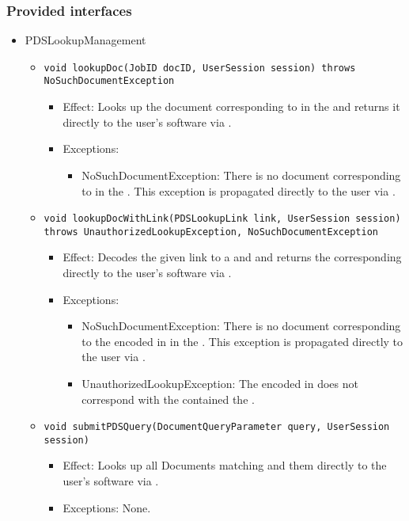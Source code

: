 \subsubsection*{Provided interfaces}
\begin{itemize}
    \item PDSLookupManagement
    \begin{itemize}
        \item \texttt{void lookupDoc(JobID docID, UserSession session) throws NoSuchDocumentException}
        \begin{itemize}
            \item Effect: Looks up the document corresponding to  in the  and returns it directly to the user's software via .
            \item Exceptions: 
			\begin{itemize}
				\item NoSuchDocumentException: There is no document corresponding to  in the . This exception is propagated directly to the user via .
			\end{itemize}
        \end{itemize}

        \item \texttt{void lookupDocWithLink(PDSLookupLink link, UserSession session) throws UnauthorizedLookupException, NoSuchDocumentException}
		    \begin{itemize}
                \item Effect: Decodes the given link to a  and  and returns the corresponding  directly to the user's software via .
                \item Exceptions: 
				\begin{itemize}
					\item NoSuchDocumentException: There is no document corresponding to the  encoded in  in the . This exception is propagated directly to the user via .
					\item UnauthorizedLookupException: The  encoded in  does not correspond with the  contained the .
				\end{itemize}
            \end{itemize}

		\item \texttt{void submitPDSQuery(DocumentQueryParameter query, UserSession session)}
        \begin{itemize}
            \item Effect: Looks up all Documents matching  and them directly to the user's software via .
            \item Exceptions: None.
        \end{itemize}
    \end{itemize}
\end{itemize}

